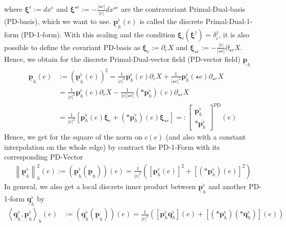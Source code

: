 \documentclass[a4paper,11pt]{scrartcl}
\newcommand{\pflh}{\mathbf{p}^{\flat}_{h}}
\newcommand{\qflh}{\mathbf{q}^{\flat}_{h}}
\newcommand{\PDpflh}{\underline{\mathbf{p}}^{\flat}_{h}}
\newcommand{\PDqflh}{\underline{\mathbf{q}}^{\flat}_{h}}
\newcommand{\PDph}{\underline{\mathbf{p}}_{h}}
\newcommand{\PDxi}{\boldsymbol{\xi}}
\begin{document}
    where \( \PDxi^{e}:=dx^{e} \) and \( \PDxi^{\star e}:= - \frac{\left| \star e \right|}{\left| e \right|}dx^{\star e}\) are the
    contravariant Primal-Dual-basis (PD-basis), which we want to use.
    \( \PDpflh(e) \) is called the discrete Primal-Dual-1-form (PD-1-form).
    With this scaling and the condition \( \PDxi_{i}(\PDxi^{j}) = \delta^{j}_{i} \), 
    it is also possible to define the covariant PD-basis as 
    \( \PDxi_{e}:=\partial_{e}X \) and \( \PDxi_{\star e}:= -\frac{\left| e \right|}{\left| \star e \right|}\partial_{\star e}X \).
    Hence, we obtain for the discrete Primal-Dual-vector field (PD-vector field) \( \PDph \)
    \begin{align}
      \PDph(e) &:= \left(\PDpflh(e)\right)^{\sharp} 
                 = \frac{1}{\left| e \right|^{2}} \pflh(e)\partial_{e}X + \frac{1}{\left|\star e \right|^{2}} \pflh(\star e)\partial_{\star e}X \\
               &= \frac{1}{\left| e \right|^{2}} \pflh(e)\partial_{e}X 
                   -\frac{1}{\left| e \right|\left|\star e \right|} \left(*\pflh\right)(e) \partial_{\star e}X \\
               &= \frac{1}{\left| e \right|^{2}}\left[ \pflh(e)\PDxi_{e} + \left(*\pflh\right)(e)\PDxi_{\star e} \right]
               =: \begin{bmatrix}
                     \pflh \\ *\pflh 
                   \end{bmatrix}^{\text{PD}} (e)
    \end{align}
    Hence, we get for the square of the norm on \( c(e) \) 
    (and also with a constant interpolation on the whole edge) by contract the PD-1-Form with its corresponding PD-Vector
    \begin{align}
      \left\| \PDpflh \right\|_{h}^{2}(e) := \left( \PDpflh\left( \PDph \right) \right)(e)
                                       = \frac{1}{\left| e \right|^{2}}\left( \left[ \pflh(e) \right]^{2} 
                                                                             +\left[ \left(*\pflh\right)(e) \right]^{2}\right)
    \end{align}
    In general, we also get a local discrete inner product between \( \PDpflh \) and another PD-1-form \( \PDqflh \) by
    \begin{align}
      \left\langle \PDqflh , \PDpflh \right\rangle_{h}(e)
          &:= \left( \PDqflh\left( \PDph \right) \right)(e)
                                       = \frac{1}{\left| e \right|^{2}}\left( \left[\pflh\qflh\right](e) 
                                                                             +\left[\left(*\pflh\right)\left(*\qflh\right)\right](e) \right)
    \end{align}
\end{document}
